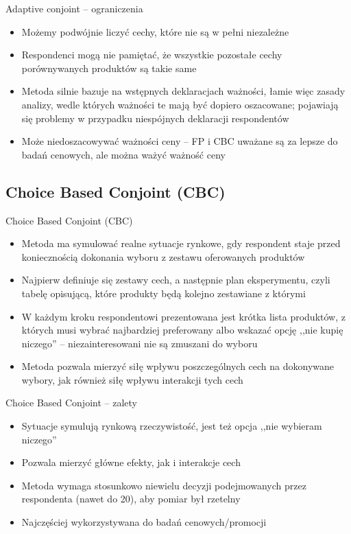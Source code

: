 \documentclass{beamer}
\begin{document}
\begin{frame}{Adaptive conjoint -- ograniczenia}
  \begin{itemize}
  \item Możemy podwójnie liczyć cechy, które nie są w pełni niezależne
  \item Respondenci mogą nie pamiętać, że wszystkie pozostałe cechy porównywanych produktów są takie same
  \item Metoda silnie bazuje na wstępnych deklaracjach ważności, łamie więc zasady analizy, wedle których ważności te mają być dopiero oszacowane; pojawiają się problemy w przypadku niespójnych deklaracji respondentów
  \item Może niedoszacowywać ważności ceny -- FP i CBC uważane są za lepsze do badań cenowych, ale można ważyć ważność ceny
  \end{itemize}
\end{frame}

\subsection{Choice Based Conjoint (CBC)}
\begin{frame}{Choice Based Conjoint (CBC)}
  \begin{itemize}
  \item Metoda ma symulować realne sytuacje rynkowe, gdy respondent staje przed koniecznością dokonania wyboru z zestawu oferowanych produktów
  \item Najpierw definiuje się zestawy cech, a następnie plan eksperymentu, czyli tabelę opisującą, które produkty będą kolejno zestawiane z którymi
  \item W każdym kroku respondentowi prezentowana jest krótka lista produktów, z których musi wybrać najbardziej preferowany albo wskazać opcję ,,nie kupię niczego'' -- niezainteresowani nie są zmuszani do wyboru
  \item Metoda pozwala mierzyć siłę wpływu poszczególnych cech na dokonywane wybory, jak również siłę wpływu interakcji tych cech
  \end{itemize}
\end{frame}

\begin{frame}{Choice Based Conjoint -- zalety}
  \begin{itemize}
  \item Sytuacje symulują rynkową rzeczywistość, jest też opcja ,,nie wybieram niczego''
  \item Pozwala mierzyć główne efekty, jak i interakcje cech
  \item Metoda wymaga stosunkowo niewielu decyzji podejmowanych przez respondenta (nawet do 20), aby pomiar był rzetelny
  \item Najczęściej wykorzystywana do badań cenowych/promocji
  \end{itemize}
\end{frame}
\end{document}
